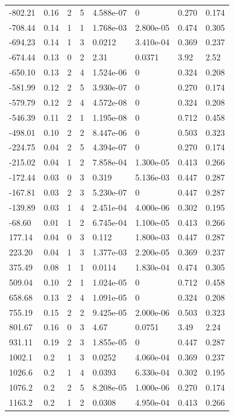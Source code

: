 \documentclass[preview]{standalone}
\begin{document}
{{\begin{tabular}{L{1.2cm}C{1.2cm} C{0.3cm}C{0.5cm} C{1.4cm}C{1.4cm} C{1.4cm}C{1.4cm}}
  -802.21  &  0.16  & 2     &  5 &  4.588e-07  & 0  & 0.270 &  0.174   \\ 
  -708.44  &  0.14  & 1     &  1 &  1.768e-03  & 2.800e-05  & 0.474 &  0.305   \\ 
  -694.23  &  0.14  & 1     &  3 &  0.0212  & 3.410e-04  & 0.369 &  0.237   \\ 
  -674.44  &  0.13  & 0     &  2 &  2.31  & 0.0371  & 3.92 &  2.52   \\ 
  -650.10  &  0.13  & 2     &  4 &  1.524e-06  & 0  & 0.324 &  0.208   \\ 
  -581.99  &  0.12  & 2     &  5 &  3.930e-07  & 0  & 0.270 &  0.174   \\ 
  -579.79  &  0.12  & 2     &  4 &  4.572e-08  & 0  & 0.324 &  0.208   \\ 
  -546.39  &  0.11  & 2     &  1 &  1.195e-08  & 0  & 0.712 &  0.458   \\ 
  -498.01  &  0.10  & 2     &  2 &  8.447e-06  & 0  & 0.503 &  0.323   \\ 
  -224.75  &  0.04  & 2     &  5 &  4.394e-07  & 0  & 0.270 &  0.174   \\ 
  -215.02  &  0.04  & 1     &  2 &  7.858e-04  & 1.300e-05  & 0.413 &  0.266   \\ 
  -172.44  &  0.03  & 0     &  3 &  0.319  & 5.136e-03  & 0.447 &  0.287   \\ 
  -167.81  &  0.03  & 2     &  3 &  5.230e-07  & 0  & 0.447 &  0.287   \\ 
  -139.89  &  0.03  & 1     &  4 &  2.451e-04  & 4.000e-06  & 0.302 &  0.195   \\ 
  -68.60  &  0.01  & 1     &  2 &  6.745e-04  & 1.100e-05  & 0.413 &  0.266   \\ 
  177.14  &  0.04  & 0     &  3 &  0.112  & 1.800e-03  & 0.447 &  0.287   \\ 
  223.20  &  0.04  & 1     &  3 &  1.377e-03  & 2.200e-05  & 0.369 &  0.237   \\ 
  375.49  &  0.08  & 1     &  1 &  0.0114  & 1.830e-04  & 0.474 &  0.305   \\ 
  509.04  &  0.10  & 2     &  1 &  1.024e-05  & 0  & 0.712 &  0.458   \\ 
  658.68  &  0.13  & 2     &  4 &  1.091e-05  & 0  & 0.324 &  0.208   \\ 
  755.19  &  0.15  & 2     &  2 &  9.425e-05  & 2.000e-06  & 0.503 &  0.323   \\ 
  801.67  &  0.16  & 0     &  3 &  4.67  & 0.0751  & 3.49 &  2.24   \\ 
  931.11  &  0.19  & 2     &  3 &  1.855e-05  & 0  & 0.447 &  0.287   \\ 
  1002.1  &   0.2  & 1     &  3 &  0.0252  & 4.060e-04  & 0.369 &  0.237   \\ 
  1026.6  &   0.2  & 1     &  4 &  0.0393  & 6.330e-04  & 0.302 &  0.195   \\ 
  1076.2  &   0.2  & 2     &  5 &  8.208e-05  & 1.000e-06  & 0.270 &  0.174   \\ 
  1163.2  &   0.2  & 1     &  2 &  0.0308  & 4.950e-04  & 0.413 &  0.266   \\ 
\hline 
\end{tabular} 

}}
\end{document}
